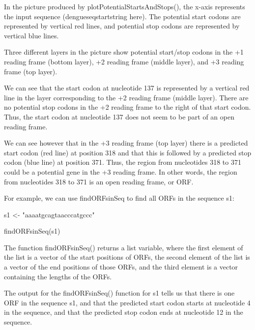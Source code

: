 \documentclass[
]{book}
\newenvironment{Shaded}{\begin{snugshade}}{\end{snugshade}}
\newcommand{\FunctionTok}[1]{\textcolor[rgb]{0.00,0.00,0.00}{#1}}
\newcommand{\NormalTok}[1]{#1}
\newcommand{\OtherTok}[1]{\textcolor[rgb]{0.56,0.35,0.01}{#1}}
\newcommand{\StringTok}[1]{\textcolor[rgb]{0.31,0.60,0.02}{#1}}
\begin{document}
In the picture produced by plotPotentialStartsAndStops(), the x-axis represents the input sequence (dengueseqstartstring here). The potential start codons are represented by vertical red lines, and potential stop codons are represented by vertical blue lines.

Three different layers in the picture show potential start/stop codons in the +1 reading frame (bottom layer), +2 reading frame (middle layer), and +3 reading frame (top layer).

We can see that the start codon at nucleotide 137 is represented by a vertical red line in the layer corresponding to the +2 reading frame (middle layer). There are no potential stop codons in the +2 reading frame to the right of that start codon. Thus, the start codon at nucleotide 137 does not seem to be part of an open reading frame.

We can see however that in the +3 reading frame (top layer) there is a predicted start codon (red line) at position 318 and that this is followed by a predicted stop codon (blue line) at position 371. Thus, the region from nucleotides 318 to 371 could be a potential gene in the +3 reading frame. In other words, the region from nucleotides 318 to 371 is an open reading frame, or ORF.

For example, we can use findORFsinSeq to find all ORFs in the sequence s1:

\begin{Shaded}
\begin{Highlighting}[]
\NormalTok{s1 }\OtherTok{\textless{}{-}} \StringTok{"aaaatgcagtaacccatgccc"}
\end{Highlighting}
\end{Shaded}

\begin{Shaded}
\begin{Highlighting}[]
\FunctionTok{findORFsinSeq}\NormalTok{(s1)}
\end{Highlighting}
\end{Shaded}

The function findORFsinSeq() returns a list variable, where the first element of the list is a vector of the start positions of ORFs, the second element of the list is a vector of the end positions of those ORFs, and the third element is a vector containing the lengths of the ORFs.

The output for the findORFsinSeq() function for s1 tells us that there is one ORF in the sequence s1, and that the predicted start codon starts at nucleotide 4 in the sequence, and that the predicted stop codon ends at nucleotide 12 in the sequence.
\end{document}
